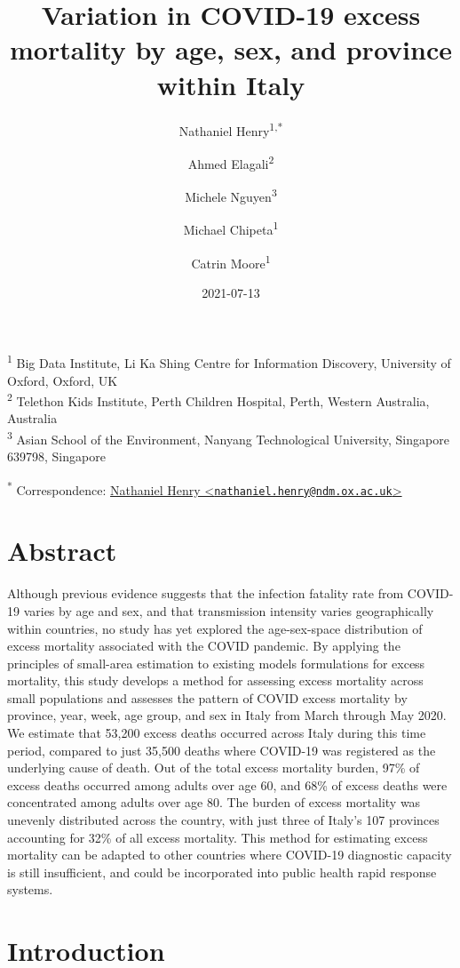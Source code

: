 \documentclass[
]{article}
\title{Variation in COVID-19 excess mortality by age, sex, and province within Italy}
\author{Nathaniel Henry\textsuperscript{1,*} \and Ahmed Elagali\textsuperscript{2} \and Michele Nguyen\textsuperscript{3} \and Michael Chipeta\textsuperscript{1} \and Catrin Moore\textsuperscript{1}}
\date{2021-07-13}
\begin{document}
\maketitle

\textsuperscript{1} Big Data Institute, Li Ka Shing Centre for Information Discovery, University of Oxford, Oxford, UK\\
\textsuperscript{2} Telethon Kids Institute, Perth Children Hospital, Perth, Western Australia, Australia\\
\textsuperscript{3} Asian School of the Environment, Nanyang Technological University, Singapore 639798, Singapore

\textsuperscript{*} Correspondence: \href{mailto:nathaniel.henry@ndm.ox.ac.uk}{Nathaniel Henry \textless{}\href{mailto:nathaniel.henry@ndm.ox.ac.uk}{\nolinkurl{nathaniel.henry@ndm.ox.ac.uk}}\textgreater{}}

\hypertarget{abstract}{%
\section{Abstract}\label{abstract}}

Although previous evidence suggests that the infection fatality rate from COVID-19 varies by age and sex, and that transmission intensity varies geographically within countries, no study has yet explored the age-sex-space distribution of excess mortality associated with the COVID pandemic. By applying the principles of small-area estimation to existing models formulations for excess mortality, this study develops a method for assessing excess mortality across small populations and assesses the pattern of COVID excess mortality by province, year, week, age group, and sex in Italy from March through May 2020. We estimate that 53,200 excess deaths occurred across Italy during this time period, compared to just 35,500 deaths where COVID-19 was registered as the underlying cause of death. Out of the total excess mortality burden, 97\% of excess deaths occurred among adults over age 60, and 68\% of excess deaths were concentrated among adults over age 80. The burden of excess mortality was unevenly distributed across the country, with just three of Italy's 107 provinces accounting for 32\% of all excess mortality. This method for estimating excess mortality can be adapted to other countries where COVID-19 diagnostic capacity is still insufficient, and could be incorporated into public health rapid response systems.

\hypertarget{introduction}{%
\section{Introduction}\label{introduction}}
\end{document}

